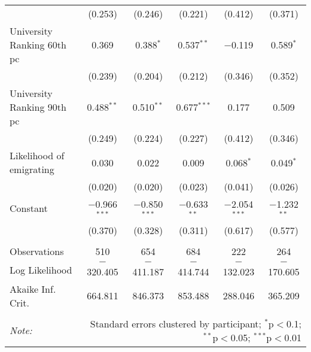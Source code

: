 \documentclass[12pt]{article}
\begin{document}
\begin{appendices}
\begin{landscape}
\begin{table}[!htbp]
\begin{tabular}{@{\extracolsep{5pt}}lccccc}
  & (0.253) & (0.246) & (0.221) & (0.412) & (0.371) \\ 
  University Ranking 60th pc & 0.369 & 0.388$^{*}$ & 0.537$^{**}$ & $-$0.119 & 0.589$^{*}$ \\ 
  & (0.239) & (0.204) & (0.212) & (0.346) & (0.352) \\ 
  University Ranking 90th pc & 0.488$^{**}$ & 0.510$^{**}$ & 0.677$^{***}$ & 0.177 & 0.509 \\ 
  & (0.249) & (0.224) & (0.227) & (0.412) & (0.346) \\ 
  Likelihood of emigrating & 0.030 & 0.022 & 0.009 & 0.068$^{*}$ & 0.049$^{*}$ \\ 
  & (0.020) & (0.020) & (0.023) & (0.041) & (0.026) \\ 
  Constant & $-$0.966$^{***}$ & $-$0.850$^{***}$ & $-$0.633$^{**}$ & $-$2.054$^{***}$ & $-$1.232$^{**}$ \\ 
  & (0.370) & (0.328) & (0.311) & (0.617) & (0.577) \\ 
 \hline \\[-1.8ex] 
Observations & 510 & 654 & 684 & 222 & 264 \\ 
Log Likelihood & $-$320.405 & $-$411.187 & $-$414.744 & $-$132.023 & $-$170.605 \\ 
Akaike Inf. Crit. & 664.811 & 846.373 & 853.488 & 288.046 & 365.209 \\ 
\hline 
\hline \\[-1.8ex] 
\textit{Note:}  & \multicolumn{5}{r}{Standard errors clustered by participant; $^{*}$p$<$0.1; $^{**}$p$<$0.05; $^{***}$p$<$0.01} \\ 
\end{tabular} 
\end{table} 
\end{landscape}

\clearpage


\end{appendices}
\end{document}
